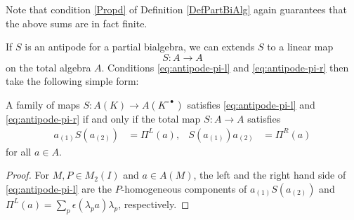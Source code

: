 \begin{Rem} Note that condition \ref{Propd} of Definition \ref{DefPartBiAlg} again guarantees that the above sums are in fact finite.
\end{Rem}

If $S$ is an antipode for a partial bialgebra, we can extends $S$ to a
linear map \[S:A\rightarrow A\] on the total algebra $A$.  Conditions
\eqref{eq:antipode-pi-l} and \eqref{eq:antipode-pi-r} then take the
following simple form:
\begin{Lem} \label{lemma:antipode}
  A family of maps $S \colon A(K) \to A(K^{\circ\bullet})$ satisfies
  \eqref{eq:antipode-pi-l} and \eqref{eq:antipode-pi-r} if and only if
  the total map $S\colon A \to A$ satisfies 
  \begin{align} \label{eq:total-antipode}
 a_{(1)}S(a_{(2)}) &= \Pi^{L}(a), &
 S(a_{(1)})a_{(2)} &= \Pi^{R}(a)
  \end{align}
for all $a\in A$.
\end{Lem}
\begin{proof}
For $M,P\in M_{2}(I)$ and $a\in A(M)$, the left and the right hand side  of \eqref{eq:antipode-pi-l} are the $P$-homogeneous components of $ a_{(1)}S(a_{(2)})$ and $\Pi^{L}(a)=\sum_{p} \epsilon(\lambda_{p}a)\lambda_{p}$, respectively.
\end{proof}


